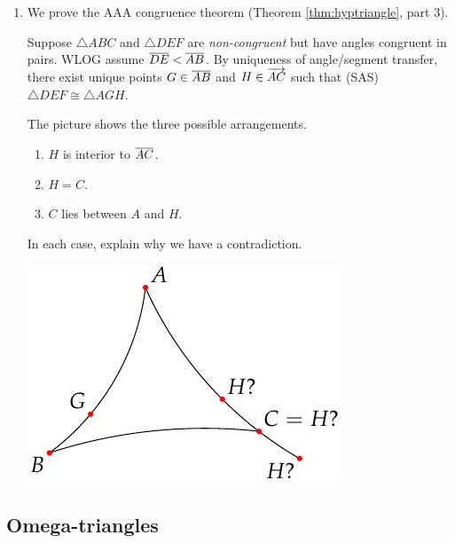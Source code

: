\begin{exercises}
\begin{enumerate}
	  
	  \item\label{exs:aaacongproof} We prove the AAA congruence theorem (Theorem \ref{thm:hyptriangle}, part 3).\par
	  Suppose $\triangle ABC$ and $\triangle DEF$ are \emph{non-congruent} but have angles congruent in pairs. WLOG assume $\overline{DE}<\overline{AB}$. By uniqueness of angle/segment transfer, there exist unique points $G\in\overline{AB}$ and $H\in\overrightarrow{AC}$ such that (SAS) $\triangle DEF\cong\triangle AGH$.\par
	  \begin{minipage}[t]{0.6\linewidth}\vspace{-5pt}
	  	The picture shows the three possible arrangements.
	  	\begin{enumerate}\itemsep0pt
	    	\item $H$ is interior to $\overline{AC}$.
	    	\item $H=C$.
	    	\item $C$ lies between $A$ and $H$.
	  	\end{enumerate}
	  	In each case, explain why we have a contradiction.
	   \end{minipage}\hfill\begin{minipage}[t]{0.39\linewidth}\vspace{-25pt}
	    \flushright\includegraphics[scale=0.95]{basic-aaa}
	   \end{minipage}
	\end{enumerate}
\end{exercises}


\clearpage



\subsection{Omega-triangles}

